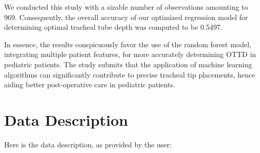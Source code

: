 \documentclass[11pt]{article}
\begin{document}
We conducted this study with a sizable number of observations amounting to 969. Consequently, the overall accuracy of our optimized regression model for determining optimal tracheal tube depth was computed to be 0.5497.

In essence, the results conspicuously favor the use of the random forest model, integrating multiple patient features, for more accurately determining OTTD in pediatric patients. The study submits that the application of machine learning algorithms can significantly contribute to precise tracheal tip placements, hence aiding better post-operative care in pediatric patients.


\clearpage
\appendix

\section{Data Description} \label{sec:data_description} Here is the data description, as provided by the user:
\end{document}
